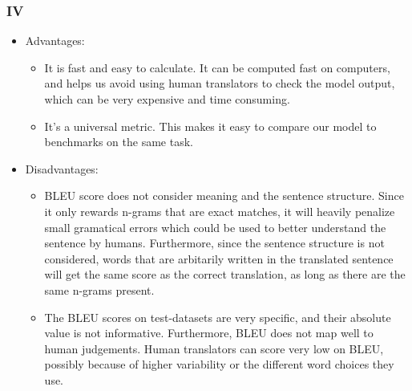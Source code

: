 \documentclass[a4paper]{article}
\begin{document}
\subsubsection{IV}
\begin{itemize}
    \item Advantages:
    \begin{itemize}
        \item It is fast and easy to calculate. It can be computed fast on computers, and helps us avoid using human translators to check the model output, which can be very expensive and time consuming.
        \item It's a universal metric. This makes it easy to compare our model to benchmarks on the same task.
    \end{itemize}
    \item Disadvantages:
    \begin{itemize}
        \item BLEU score does not consider meaning and the sentence structure. Since it only rewards n-grams that are exact matches, it will heavily penalize small gramatical errors which could be used to better understand the sentence by humans. Furthermore, since the sentence structure is not considered, words that are arbitarily written in the translated sentence will get the same score as the correct translation, as long as there are the same n-grams present.
        \item The BLEU scores on test-datasets are very specific, and their absolute value is not informative. Furthermore, BLEU does not map well to human judgements. Human translators can score very low on BLEU, possibly because of higher variability or the different word choices they use.
    \end{itemize}
\end{itemize}
\end{document}
